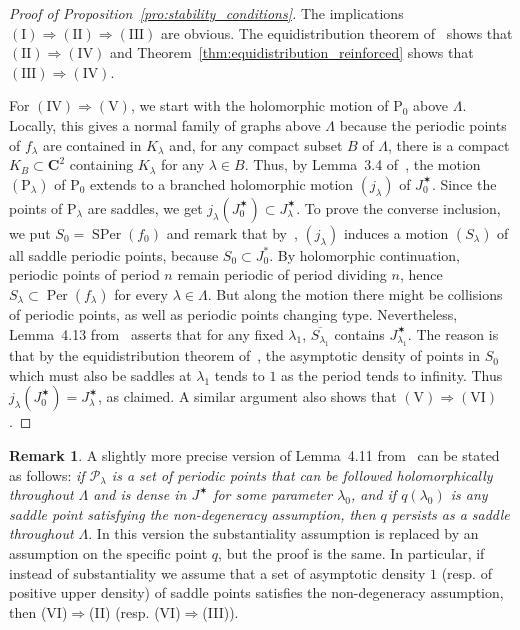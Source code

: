 \documentclass[oneside, 12pt]{amsart}
\newcommand{\la}{\lambda}
\newcommand{\lo}{{\lambda_0}}
\newcommand{\jstar}{J^\varstar}
\DeclareMathOperator{\Per}{Per}
\DeclareMathOperator{\SPer}{SPer}
\newcommand{\C}{\mathbf{C}}
\theoremstyle{plain}
\theoremstyle{definition}
\newtheorem{rem}[thm]{Remark}
\numberwithin{equation}{section}       %
\numberwithin{equation}{section}       %
\begin{document}
\begin{proof}[Proof of Proposition~\ref{pro:stability_conditions}]
The implications $\mathrm{(I)}\Rightarrow \mathrm{(II)} \Rightarrow \mathrm{(III)}$ are obvious. The  equidistribution theorem of~\cite{bls2} shows that 
$\mathrm{(II)}\Rightarrow \mathrm{(IV)}$ and  Theorem~\ref{thm:equidistribution_reinforced}
shows that $\mathrm{(III)}\Rightarrow \mathrm{(IV)}$.  

 

For $\mathrm{(IV)}\Rightarrow \mathrm{(V)}$, we start with the holomorphic motion of $\mathrm P_0$ above $\Lambda$. 
Locally, this gives a normal family of graphs above $\Lambda$ because the periodic points of $f_\lambda$ are contained in $K_{\lambda}$ and, for any compact subset $B$ of  $\Lambda$, there is a compact $K_B\subset \C^2$ containing $K_{\lambda}$ for any $\lambda\in B$. 
Thus, by Lemma~3.4 of~\cite{tangencies}, the motion $(\mathrm P_\lambda)$ of $\mathrm P_0$ extends to a branched holomorphic motion $(j_\lambda)$ of $\jstar_{0}$. 
Since the points of $\mathrm P_\lambda$ are saddles, we get $ j_\lambda(\jstar_{0}) \subset \jstar_\la$. 
To prove the converse inclusion,  we put $S_0=\SPer(f_0)$ and   remark that by~\cite[Lem. 4.10]{tangencies},
$(j_\lambda)$ induces a motion $(S_\lambda)$ of all saddle periodic points,  because $S_0 \subset J^*_0$. 
By holomorphic continuation, periodic points of period $n$ remain periodic of period dividing $n$, hence $S_\lambda\subset \Per(f_\lambda)$ for every $\lambda\in \Lambda$. But along the motion there might be collisions of periodic points, as well as periodic points changing type. 
Nevertheless, Lemma~4.13 from~\cite{tangencies}
asserts that for any fixed $\lambda_1$, 
$\overline {S_{\lambda_1}}$ contains $\jstar_{\lambda_1}$. The reason is that 
by the equidistribution theorem of~\cite{bls2}, the asymptotic 
density of points in $S_0$ which must also be saddles at $\lambda_1$ tends to $1$ as the period tends to infinity. Thus $ j_\lambda(\jstar_{0}) = \jstar_\la$, as claimed.
A similar  argument also shows that  $\mathrm{(V)}\Rightarrow \mathrm{(VI)}$.
\end{proof}

\begin{vlongue}
\begin{rem}\label{rem:partial_substantiality}
A slightly more precise version of 
Lemma~4.11 from~\cite{tangencies} can be stated as follows: {\emph{if $\mathcal P_\lambda$ is a 
set of periodic points that can be followed holomorphically throughout $\Lambda$ and is 
dense in $\jstar$ for some parameter $\lo$, and  if $q(\lo)$ is any saddle point satisfying the non-degeneracy assumption,  then $q$ persists as a saddle throughout $\Lambda$}}. In this version
 the  substantiality assumption is replaced by an assumption on the specific point $q$, but the proof is the same.  In particular, if instead of substantiality we assume that a set 
 of asymptotic density $1$ (resp. of positive upper density)  
 of saddle points satisfies the non-degeneracy assumption, then 
 (VI)$\Rightarrow$(II)  (resp.   (VI)$\Rightarrow$(III)). 
\end{rem}
\end{vlongue}
\end{document}
